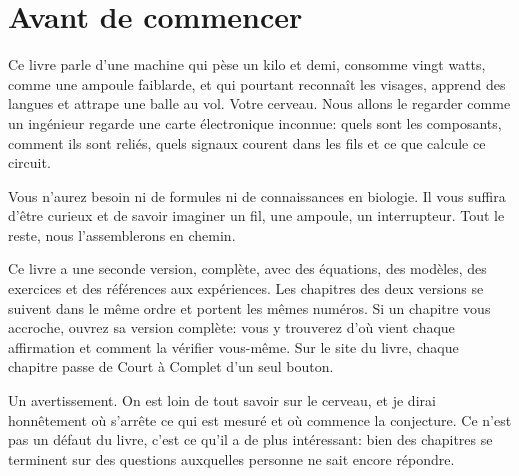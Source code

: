 \chapter*{Avant de commencer}

Ce livre parle d'une machine qui pèse un kilo et demi, consomme vingt watts, comme une ampoule faiblarde, et qui pourtant reconnaît les visages, apprend des langues et attrape une balle au vol. Votre cerveau. Nous allons le regarder comme un ingénieur regarde une carte électronique inconnue: quels sont les composants, comment ils sont reliés, quels signaux courent dans les fils et ce que calcule ce circuit.

Vous n'aurez besoin ni de formules ni de connaissances en biologie. Il vous suffira d'être curieux et de savoir imaginer un fil, une ampoule, un interrupteur. Tout le reste, nous l'assemblerons en chemin.

Ce livre a une seconde version, complète, avec des équations, des modèles, des exercices et des références aux expériences. Les chapitres des deux versions se suivent dans le même ordre et portent les mêmes numéros. Si un chapitre vous accroche, ouvrez sa version complète: vous y trouverez d'où vient chaque affirmation et comment la vérifier vous-même. Sur le site du livre, chaque chapitre passe de \og Court\fg{} à \og Complet\fg{} d'un seul bouton.

Un avertissement. On est loin de tout savoir sur le cerveau, et je dirai honnêtement où s'arrête ce qui est mesuré et où commence la conjecture. Ce n'est pas un défaut du livre, c'est ce qu'il a de plus intéressant: bien des chapitres se terminent sur des questions auxquelles personne ne sait encore répondre.

